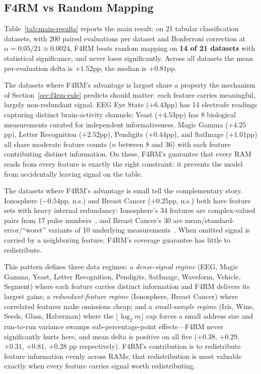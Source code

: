 \documentclass[runningheads]{llncs}
\begin{document}
\subsection{F4RM vs Random Mapping}
\label{sec:results-f4rm}

Table~\ref{tab:main-results} reports the main result: on 21 tabular classification datasets, with 200 paired evaluations per dataset and Bonferroni correction at $\alpha = 0.05/21 \approx 0.0024$, F4RM beats random mapping on \textbf{14 of 21 datasets} with statistical significance, and never loses significantly. Across all datasets the mean per-evaluation delta is $+1.52$pp; the median is $+0.81$pp.

The datasets where F4RM's advantage is largest share a property the mechanism of Section~\ref{sec:f4rm-rule} predicts should matter: each feature carries meaningful, largely non-redundant signal. EEG Eye State ($+6.43$pp) has 14 electrode readings capturing distinct brain-activity channels; Yeast ($+4.53$pp) has 8 biological measurements curated for independent informativeness. Magic Gamma ($+4.25$pp), Letter Recognition ($+2.52$pp), Pendigits ($+0.44$pp), and SatImage ($+1.01$pp) all share moderate feature counts ($n$ between 8 and 36) with each feature contributing distinct information. On these, F4RM's guarantee that every RAM reads from every feature is exactly the right constraint: it prevents the model from accidentally leaving signal on the table.

The datasets where F4RM's advantage is small tell the complementary story. Ionosphere ($-0.54$pp, n.s.) and Breast Cancer ($+0.25$pp, n.s.) both have feature sets with heavy internal redundancy: Ionosphere's 34 features are complex-valued pairs from 17 pulse numbers~\cite{sigillito1989classification}, and Breast Cancer's 30 are mean/standard-error/``worst'' variants of 10 underlying measurements~\cite{street1993nuclear}. When omitted signal is carried by a neighboring feature, F4RM's coverage guarantee has little to redistribute.

This pattern defines three data regimes: a \emph{dense-signal regime} (EEG, Magic Gamma, Yeast, Letter Recognition, Pendigits, SatImage, Waveform, Vehicle, Segment) where each feature carries distinct information and F4RM delivers its largest gains; a \emph{redundant-feature regime} (Ionosphere, Breast Cancer) where correlated features make omissions cheap; and a \emph{small-sample regime} (Iris, Wine, Seeds, Glass, Haberman) where the $\lfloor \log_2 m \rfloor$ cap forces a small address size and run-to-run variance swamps sub-percentage-point effects---F4RM never significantly hurts here, and mean delta is positive on all five ($+0.38$, $+0.29$, $+0.31$, $+0.81$, $+0.28$ pp respectively). F4RM's contribution is to redistribute feature information evenly across RAMs; that redistribution is most valuable exactly when every feature carries signal worth redistributing.
\end{document}

